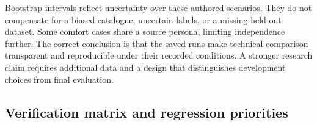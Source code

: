 Bootstrap intervals reflect uncertainty over these authored scenarios. They do not compensate for a biased catalogue, uncertain labels, or a missing held-out dataset. Some comfort cases share a source persona, limiting independence further. The correct conclusion is that the saved runs make technical comparison transparent and reproducible under their recorded conditions. A stronger research claim requires additional data and a design that distinguishes development choices from final evaluation.

\subsection{Verification matrix and regression priorities}

\begingroup
\small{}
\setlength{\tabcolsep}{4pt}
\setlength{\TableInnerWidth}{\dimexpr\linewidth-24pt\relax}
